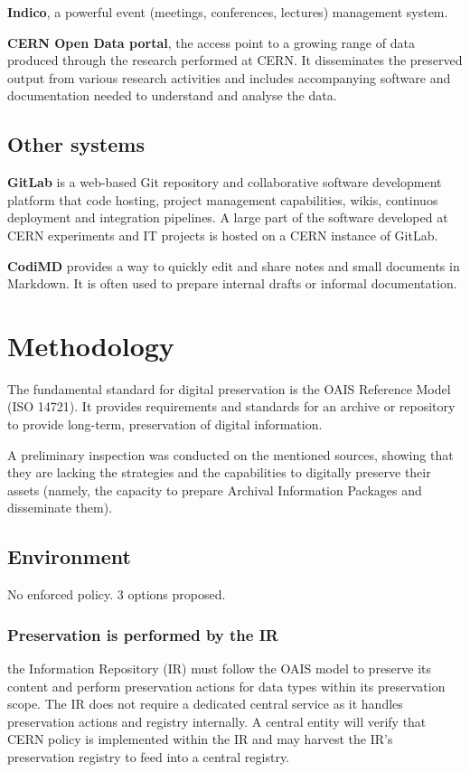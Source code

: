 \documentclass[11pt]{IEEEtran}
\begin{document}
\textbf{Indico}, a powerful event (meetings, conferences, lectures) management system.

\textbf{CERN Open Data portal}, the access point to a growing range of data produced through the research performed at CERN. It disseminates the preserved output from various research activities and includes accompanying software and documentation needed to understand and analyse the data.

\subsection{Other systems}


\textbf{GitLab} is a web-based Git repository and collaborative software development platform that code hosting, project management capabilities, wikis, continuos deployment and integration pipelines. A large part of the software developed at CERN experiments and IT projects is hosted on a CERN instance of GitLab.

\textbf{CodiMD} provides a way to quickly edit and share notes and small documents in Markdown. It is often used to prepare internal drafts or informal documentation.


\section{Methodology}

The fundamental standard for digital preservation is the OAIS Reference Model\cite{OAIS2002} (ISO 14721). It provides requirements and standards for an archive or repository to provide long-term, preservation of digital information.



A preliminary inspection was conducted on the mentioned sources, showing that they are lacking the strategies and the capabilities to digitally preserve their assets (namely, the capacity to prepare Archival Information Packages and disseminate them).





\subsection{Environment}

No enforced policy. 3 options proposed. \cite{strategy}


\subsubsection{Preservation is performed by the IR} the Information Repository (IR) must follow the OAIS model to preserve its content and perform preservation actions for data types within its preservation scope. The IR does not require a dedicated central service as it handles preservation actions and registry internally. A central entity will verify that CERN policy is implemented within the IR and may harvest the IR's preservation registry to feed into a central registry.
\end{document}
